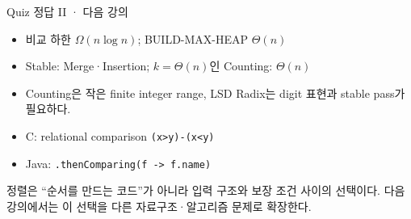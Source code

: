 \begin{frame}{Quiz 정답 II · 다음 강의}
\begin{itemize}
\item 비교 하한 $\Omega(n\log n)$; BUILD-MAX-HEAP $\Theta(n)$
\item Stable: Merge·Insertion; $k=\Theta(n)$인 Counting: $\Theta(n)$
\item Counting은 작은 finite integer range, LSD Radix는 digit 표현과 stable pass가 필요하다.
\item C: relational comparison \texttt{(x>y)-(x<y)}
\item Java: \texttt{.thenComparing(f -> f.name)}
\end{itemize}
\begin{takeaway}정렬은 “순서를 만드는 코드”가 아니라 입력 구조와 보장 조건 사이의 선택이다. 다음 강의에서는 이 선택을 다른 자료구조·알고리즘 문제로 확장한다.\end{takeaway}
\end{frame}
